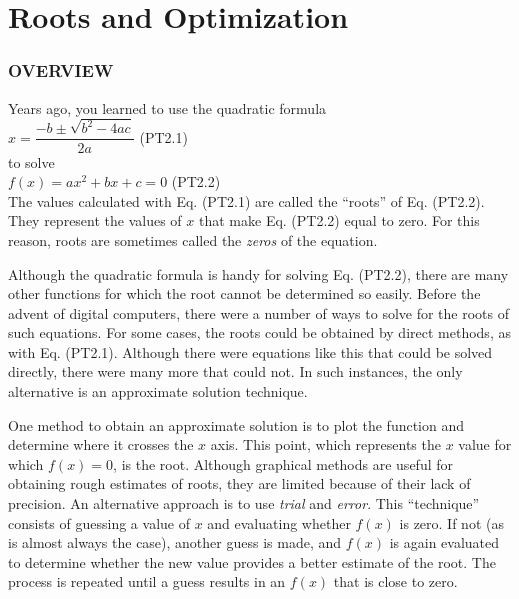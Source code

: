 \documentclass[../main.tex]{subfiles}
\begin{document}
\part{Roots and Optimization}

\section[OVERVIEW]{OVERVIEW}
\noindent Years ago, you learned to use the quadratic formula\\

$x = \dfrac{-b\pm \sqrt{b^2-4ac}}{2a}$
\hfill (PT2.1)\\

\noindent to solve\\

$f(x) = ax^2 +bx +c =0$
\hfill (PT2.2)\\

\noindent The values calculated with Eq. (PT2.1) are called the ``roots'' of Eq. (PT2.2). They represent
the values of $x$ that make Eq. (PT2.2) equal to zero. For this reason, roots are sometimes
called the \emph{zeros} of the equation.

Although the quadratic formula is handy for solving Eq. (PT2.2), there are many other
functions for which the root cannot be determined so easily. Before the advent of digital computers,
there were a number of ways to solve for the roots of such equations. For some cases,
the roots could be obtained by direct methods, as with Eq. (PT2.1). Although there
were equations like this that could be solved directly, there were many more that could
not. In such instances, the only alternative is an approximate solution technique.

One method to obtain an approximate solution is to plot the function and determine
where it crosses the $x$ axis. This point, which represents the $x$ value for
which $f (x) = 0$, is the root. Although graphical methods are useful for obtaining
rough estimates of roots, they are limited because of their lack of precision. An alternative
approach is to use \emph{trial} and \emph{error}. This ``technique'' consists of guessing a
value of $x$ and evaluating whether $f (x)$ is zero. If not (as is almost always the case),
another guess is made, and $f (x)$ is again
evaluated to determine whether the new value provides a better estimate of the root. The
process is repeated until a guess results in an $f (x)$ that is close to zero.
\end{document}
